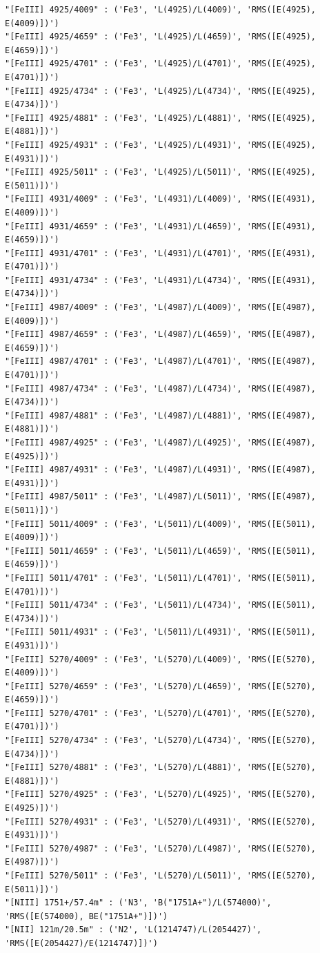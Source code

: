 \documentclass[11pt]{article}
\begin{document}
\begin{Verbatim}[commandchars=\\\{\}]
"[FeIII] 4925/4009" : ('Fe3', 'L(4925)/L(4009)', 'RMS([E(4925), E(4009)])')
"[FeIII] 4925/4659" : ('Fe3', 'L(4925)/L(4659)', 'RMS([E(4925), E(4659)])')
"[FeIII] 4925/4701" : ('Fe3', 'L(4925)/L(4701)', 'RMS([E(4925), E(4701)])')
"[FeIII] 4925/4734" : ('Fe3', 'L(4925)/L(4734)', 'RMS([E(4925), E(4734)])')
"[FeIII] 4925/4881" : ('Fe3', 'L(4925)/L(4881)', 'RMS([E(4925), E(4881)])')
"[FeIII] 4925/4931" : ('Fe3', 'L(4925)/L(4931)', 'RMS([E(4925), E(4931)])')
"[FeIII] 4925/5011" : ('Fe3', 'L(4925)/L(5011)', 'RMS([E(4925), E(5011)])')
"[FeIII] 4931/4009" : ('Fe3', 'L(4931)/L(4009)', 'RMS([E(4931), E(4009)])')
"[FeIII] 4931/4659" : ('Fe3', 'L(4931)/L(4659)', 'RMS([E(4931), E(4659)])')
"[FeIII] 4931/4701" : ('Fe3', 'L(4931)/L(4701)', 'RMS([E(4931), E(4701)])')
"[FeIII] 4931/4734" : ('Fe3', 'L(4931)/L(4734)', 'RMS([E(4931), E(4734)])')
"[FeIII] 4987/4009" : ('Fe3', 'L(4987)/L(4009)', 'RMS([E(4987), E(4009)])')
"[FeIII] 4987/4659" : ('Fe3', 'L(4987)/L(4659)', 'RMS([E(4987), E(4659)])')
"[FeIII] 4987/4701" : ('Fe3', 'L(4987)/L(4701)', 'RMS([E(4987), E(4701)])')
"[FeIII] 4987/4734" : ('Fe3', 'L(4987)/L(4734)', 'RMS([E(4987), E(4734)])')
"[FeIII] 4987/4881" : ('Fe3', 'L(4987)/L(4881)', 'RMS([E(4987), E(4881)])')
"[FeIII] 4987/4925" : ('Fe3', 'L(4987)/L(4925)', 'RMS([E(4987), E(4925)])')
"[FeIII] 4987/4931" : ('Fe3', 'L(4987)/L(4931)', 'RMS([E(4987), E(4931)])')
"[FeIII] 4987/5011" : ('Fe3', 'L(4987)/L(5011)', 'RMS([E(4987), E(5011)])')
"[FeIII] 5011/4009" : ('Fe3', 'L(5011)/L(4009)', 'RMS([E(5011), E(4009)])')
"[FeIII] 5011/4659" : ('Fe3', 'L(5011)/L(4659)', 'RMS([E(5011), E(4659)])')
"[FeIII] 5011/4701" : ('Fe3', 'L(5011)/L(4701)', 'RMS([E(5011), E(4701)])')
"[FeIII] 5011/4734" : ('Fe3', 'L(5011)/L(4734)', 'RMS([E(5011), E(4734)])')
"[FeIII] 5011/4931" : ('Fe3', 'L(5011)/L(4931)', 'RMS([E(5011), E(4931)])')
"[FeIII] 5270/4009" : ('Fe3', 'L(5270)/L(4009)', 'RMS([E(5270), E(4009)])')
"[FeIII] 5270/4659" : ('Fe3', 'L(5270)/L(4659)', 'RMS([E(5270), E(4659)])')
"[FeIII] 5270/4701" : ('Fe3', 'L(5270)/L(4701)', 'RMS([E(5270), E(4701)])')
"[FeIII] 5270/4734" : ('Fe3', 'L(5270)/L(4734)', 'RMS([E(5270), E(4734)])')
"[FeIII] 5270/4881" : ('Fe3', 'L(5270)/L(4881)', 'RMS([E(5270), E(4881)])')
"[FeIII] 5270/4925" : ('Fe3', 'L(5270)/L(4925)', 'RMS([E(5270), E(4925)])')
"[FeIII] 5270/4931" : ('Fe3', 'L(5270)/L(4931)', 'RMS([E(5270), E(4931)])')
"[FeIII] 5270/4987" : ('Fe3', 'L(5270)/L(4987)', 'RMS([E(5270), E(4987)])')
"[FeIII] 5270/5011" : ('Fe3', 'L(5270)/L(5011)', 'RMS([E(5270), E(5011)])')
"[NIII] 1751+/57.4m" : ('N3', 'B("1751A+")/L(574000)', 'RMS([E(574000), BE("1751A+")])')
"[NII] 121m/20.5m" : ('N2', 'L(1214747)/L(2054427)', 'RMS([E(2054427)/E(1214747)])')

\end{Verbatim}
\end{document}
